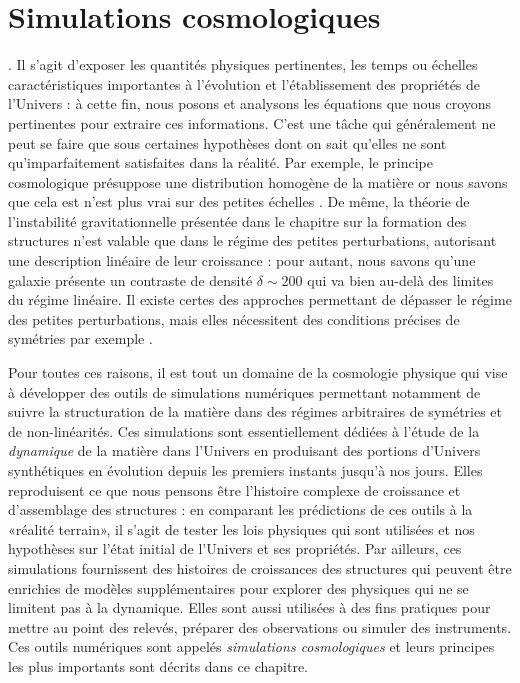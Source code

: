 \chapter{Simulations cosmologiques}

. Il s'agit d'exposer les quantités physiques pertinentes, les temps ou échelles caractéristiques importantes à l'évolution et l'établissement des propriétés de l'Univers : à cette fin, nous posons et analysons les équations que nous croyons pertinentes pour extraire ces informations. C'est une tâche qui généralement ne peut se faire que sous certaines hypothèses dont on sait qu'elles ne sont qu'imparfaitement satisfaites dans la réalité. Par exemple, le principe cosmologique présuppose une distribution homogène de la matière or nous savons que cela est n'est plus vrai sur des petites échelles .  De même, la théorie de l'instabilité gravitationnelle présentée dans le chapitre sur la formation des structures n'est valable que dans le régime des petites perturbations, autorisant une description linéaire de leur croissance : pour autant, nous savons qu'une galaxie présente un contraste de densité $\delta \sim 200$ qui va bien au-delà des limites du régime linéaire. Il existe certes des approches permettant de dépasser le régime des petites perturbations, mais elles nécessitent des conditions précises de symétries par exemple .


Pour toutes ces raisons, il est tout un domaine de la cosmologie physique qui vise à développer des outils de simulations numériques permettant notamment de suivre la structuration de la matière dans des régimes arbitraires de symétries et de non-linéarités. Ces simulations sont essentiellement dédiées à l'étude de la \textit{dynamique} de la matière dans l'Univers en produisant des portions d'Univers synthétiques en évolution depuis les premiers instants jusqu'à nos jours. Elles reproduisent ce que nous pensons être l'histoire complexe de croissance et d'assemblage des structures : en comparant les prédictions de ces outils à la «réalité terrain», il s'agit de tester les lois physiques qui sont utilisées et nos hypothèses sur l'état initial de l'Univers et ses propriétés. Par ailleurs, ces simulations fournissent des histoires de croissances des structures qui peuvent être enrichies de modèles supplémentaires pour explorer des physiques qui ne se limitent pas à la dynamique. Elles sont aussi utilisées à des fins pratiques pour mettre au point des relevés, préparer des observations ou simuler des instruments. Ces outils numériques sont appelés \textit{simulations cosmologiques} et leurs principes les plus importants sont décrits dans ce chapitre.

